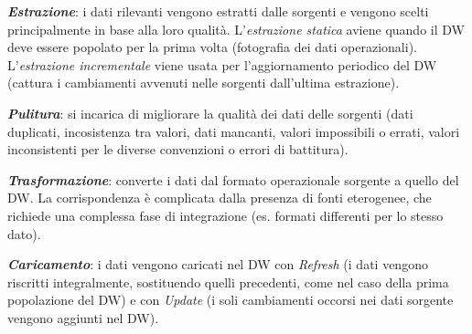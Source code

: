 \documentclass[a4paper, notitlepage, 9pt]{extreport}
\begin{document}
\noindent
\textit{\textbf{Estrazione}}: i dati rilevanti vengono estratti dalle sorgenti e vengono scelti principalmente in base alla loro qualità. L'\textit{estrazione statica} aviene quando il DW deve essere popolato per la prima volta (fotografia dei dati operazionali). L'\textit{estrazione incrementale} viene usata per l’aggiornamento periodico del DW (cattura i cambiamenti avvenuti nelle sorgenti dall’ultima estrazione).

\noindent
\textit{\textbf{Pulitura}}: si incarica di migliorare la qualità dei dati delle sorgenti (dati duplicati, incosistenza tra valori, dati mancanti, valori impossibili o errati, valori inconsistenti per le diverse convenzioni o errori di battitura).
\newline

\noindent
\textit{\textbf{Trasformazione}}: converte i dati dal formato operazionale sorgente a quello del DW. La corrispondenza è complicata dalla presenza di fonti eterogenee, che richiede una complessa fase di integrazione (es. formati differenti per lo stesso dato).
\newline

\noindent
\textit{\textbf{Caricamento}}: i dati vengono caricati nel DW con \textit{Refresh} (i dati vengono riscritti integralmente, sostituendo quelli precedenti, come nel caso della prima popolazione del DW) e con \textit{Update} (i soli cambiamenti occorsi nei dati sorgente vengono aggiunti nel DW).
\end{document}
